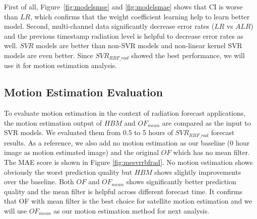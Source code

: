 \documentclass[conference]{IEEEtran}
\begin{document}
First of all, Figure~\ref{fig:modelsmse} and \ref{fig:modelsmae} shows that CI
is worse than $LR$, which confirms that the weight coefficient learning help to learn better model.
Second, multi-channel data significantly decrease error rates ($LR$ vs $ALR$) and 
the previous timestamp radiation level is helpful to decrease error rates as well.
$SVR$ models are better than non-SVR models and non-linear kernel SVR models are even better.
Since $SVR_{RBF\_rad}$ showed the best performance, we will use it for 
motion estimation analysis.

\subsection{Motion Estimation Evaluation}
\label{subsec:MEEval}
To evaluate motion estimation in the context of radiation forecast applications, 
the motion estimation output of $HBM$ and $OF_{mean}$ are compared as the input to SVR models. 
We evaluated them from 0.5 to 5 hours of $SVR_{RBF\_rad}$ forecast results.
As a reference, we also add no motion estimation as our baseline (0 hour image as motion estimated image) 
and the original $OF$ which has no mean filter.  The MAE score is shown in
Figure \ref{fig:mesvrrbfrad}.
No motion estimation shows obviously the worst prediction quality but $HBM$ shows
slightly improvements over the baseline. Both $OF$ and $OF_{mean}$ shows significantly
better prediction quality and the mean filter is helpful across different
forecast time. It confirms that OF with mean filter is the best choice for satellite motion estimation
and we will use $OF_{mean}$ as our motion estimation method for next analysis.


\end{document}
